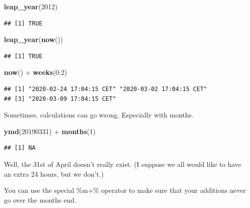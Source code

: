 \documentclass[]{tufte-book}
\newenvironment{Shaded}{}{}
\newcommand{\DecValTok}[1]{\textcolor[rgb]{0.25,0.63,0.44}{#1}}
\newcommand{\KeywordTok}[1]{\textcolor[rgb]{0.00,0.44,0.13}{\textbf{#1}}}
\newcommand{\NormalTok}[1]{#1}
\newcommand{\OperatorTok}[1]{\textcolor[rgb]{0.40,0.40,0.40}{#1}}
\newcommand{\StringTok}[1]{\textcolor[rgb]{0.25,0.44,0.63}{#1}}
\begin{document}
\begin{Shaded}
\begin{Highlighting}[]
\KeywordTok{leap_year}\NormalTok{(}\DecValTok{2012}\NormalTok{)}
\end{Highlighting}
\end{Shaded}

\begin{verbatim}
## [1] TRUE
\end{verbatim}

\begin{Shaded}
\begin{Highlighting}[]
\KeywordTok{leap_year}\NormalTok{(}\KeywordTok{now}\NormalTok{())}
\end{Highlighting}
\end{Shaded}

\begin{verbatim}
## [1] TRUE
\end{verbatim}

\begin{Shaded}
\begin{Highlighting}[]
\KeywordTok{now}\NormalTok{() }\OperatorTok{+}\StringTok{ }\KeywordTok{weeks}\NormalTok{(}\DecValTok{0}\OperatorTok{:}\DecValTok{2}\NormalTok{)}
\end{Highlighting}
\end{Shaded}

\begin{verbatim}
## [1] "2020-02-24 17:04:15 CET" "2020-03-02 17:04:15 CET"
## [3] "2020-03-09 17:04:15 CET"
\end{verbatim}

Sometimes, calculations can go wrong. Especially with months.

\begin{Shaded}
\begin{Highlighting}[]
\KeywordTok{ymd}\NormalTok{(}\DecValTok{20190331}\NormalTok{) }\OperatorTok{+}\StringTok{ }\KeywordTok{months}\NormalTok{(}\DecValTok{1}\NormalTok{)}
\end{Highlighting}
\end{Shaded}

\begin{verbatim}
## [1] NA
\end{verbatim}

Well, the 31st of April doesn't really exist. (I suppose we all would like to have an extra 24 hours, but we don't.)

You can use the special \%m+\% operator to make sure that your additions never go over the months end.
\end{document}
